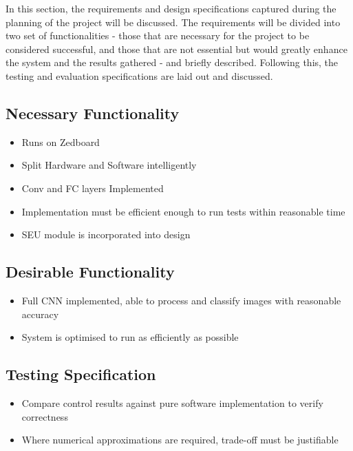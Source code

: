 \documentclass[12pt]{article}
\begin{document}
In this section, the requirements and design specifications captured during the planning of the project will be discussed. The requirements will be divided into two set of functionalities - those that are necessary for the project to be considered successful, and those that are not essential but would greatly enhance the system and the results gathered - and briefly described. Following this, the testing and evaluation specifications are laid out and discussed.

\subsection{Necessary Functionality}
\label{sec:ProjSpec-Necessary}
\vspace{-12pt}

\begin{itemize}
\item Runs on Zedboard
\item Split Hardware and Software intelligently
\item Conv and FC layers Implemented
\item Implementation must be efficient enough to run tests within reasonable time
\item SEU module is incorporated into design
\end{itemize}

\subsection{Desirable Functionality}
\label{sec:ProjSpec-Desirable}
\vspace{-12pt}

\begin{itemize}
\item Full CNN implemented, able to process and classify images with reasonable accuracy
\item System is optimised to run as efficiently as possible
\end{itemize}

\subsection{Testing Specification}
\label{sec:ProjSpec-TestSpec}
\vspace{-12pt}

\begin{itemize}
\item Compare control results against pure software implementation to verify correctness
\item Where numerical approximations are required, trade-off must be justifiable
\end{itemize}
\end{document}
